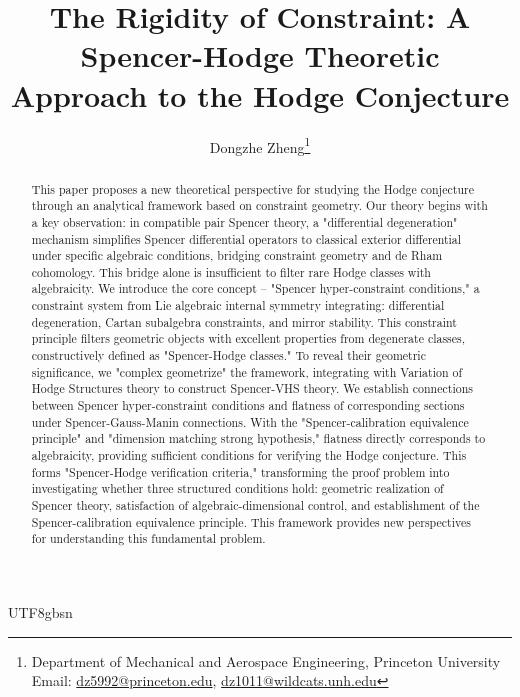 \documentclass[a4paper,12pt]{extarticle}
\theoremstyle{definition}
\begin{document}
\begin{CJK}{UTF8}{gbsn}


\pagestyle{plain}

\title{The Rigidity of Constraint: A Spencer-Hodge Theoretic Approach to the Hodge Conjecture}
\author{Dongzhe Zheng\thanks{Department of Mechanical and Aerospace Engineering, Princeton University\\ Email: \href{mailto:dz5992@princeton.edu}{dz5992@princeton.edu}, \href{mailto:dz1011@wildcats.unh.edu}{dz1011@wildcats.unh.edu}}}
\date{}
\maketitle

\begin{abstract}
This paper proposes a new theoretical perspective for studying the Hodge conjecture through an analytical framework based on constraint geometry. Our theory begins with a key observation: in compatible pair Spencer theory, a "differential degeneration" mechanism simplifies Spencer differential operators to classical exterior differential under specific algebraic conditions, bridging constraint geometry and de Rham cohomology. This bridge alone is insufficient to filter rare Hodge classes with algebraicity. We introduce the core concept -- "Spencer hyper-constraint conditions," a constraint system from Lie algebraic internal symmetry integrating: differential degeneration, Cartan subalgebra constraints, and mirror stability. This constraint principle filters geometric objects with excellent properties from degenerate classes, constructively defined as "Spencer-Hodge classes." To reveal their geometric significance, we "complex geometrize" the framework, integrating with Variation of Hodge Structures theory to construct Spencer-VHS theory. We establish connections between Spencer hyper-constraint conditions and flatness of corresponding sections under Spencer-Gauss-Manin connections. With the "Spencer-calibration equivalence principle" and "dimension matching strong hypothesis," flatness directly corresponds to algebraicity, providing sufficient conditions for verifying the Hodge conjecture. This forms "Spencer-Hodge verification criteria," transforming the proof problem into investigating whether three structured conditions hold: geometric realization of Spencer theory, satisfaction of algebraic-dimensional control, and establishment of the Spencer-calibration equivalence principle. This framework provides new perspectives for understanding this fundamental problem.
\end{abstract}


\end{CJK}
\end{document}
